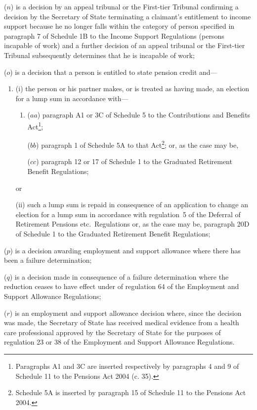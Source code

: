 \documentclass[12pt,a4paper]{article}
\begin{document}
\begin{enumerate}
($n$) is a decision by 
an appeal tribunal or  %
the First-tier Tribunal  %
confirming a decision by the Secretary of State terminating a claimant’s entitlement to income support because he no longer falls within the category of person specified in paragraph 7 of Schedule 1B to the Income Support Regulations (persons incapable of work) and a further 
decision of an appeal tribunal or the First-tier Tribunal  %
subsequently determines that he is incapable of work;

($o$) is a decision that a person is entitled to state pension credit and—
\begin{enumerate}\item[]
(i) the person or his partner makes, or is treated as having made, an election for a lump sum in accordance with—
\begin{enumerate}\item[]
($aa$) paragraph A1 or 3C of Schedule 5 to the Contributions and Benefits Act\footnote{Paragraphs A1 and 3C are inserted respectively by paragraphs 4 and 9 of Schedule 11 to the Pensions Act 2004 (c. 35).};

($bb$) paragraph 1 of Schedule 5A to that Act\footnote{Schedule 5A is inserted by paragraph 15 of Schedule 11 to the Pensions Act 2004.}; or, as the case may be,

($cc$) paragraph 12 or 17 of Schedule 1 to the Graduated Retirement Benefit Regulations;
\end{enumerate}
or

(ii) such a lump sum is repaid in consequence of an application to change an election for a lump sum in accordance with regulation~5 of the Deferral of Retirement Pensions etc.\ Regulations or, as the case may be, paragraph 20D of Schedule 1 to the Graduated Retirement Benefit Regulations;
\end{enumerate}

($p$) is a decision awarding employment and support allowance where there has been a failure determination;

($q$) is a decision made in consequence of a failure determination where the reduction ceases to have effect under of regulation 64 of the Employment and Support Allowance Regulations;

($r$) is an employment and support allowance decision where, since the decision was made, the Secretary of State has received medical evidence from a health care professional approved by the Secretary of State for the purposes of regulation 23 or 38 of the Employment and Support Allowance Regulations.
\end{enumerate}
\end{document}
